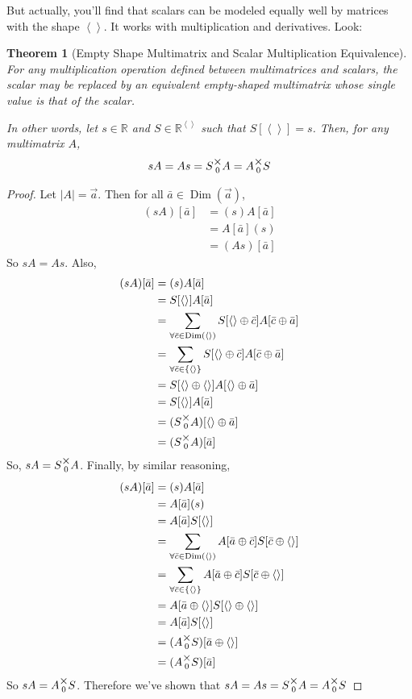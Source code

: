 \documentclass[12pt]{book}
\theoremstyle{plain}
\newtheorem{theorem}{Theorem}[chapter]
\theoremstyle{definition}
\theoremstyle{ppart}
\theoremstyle{case}
\theoremstyle{solution}
\DeclareMathOperator{\Dim}{Dim}
\newcommand{\mmult}[1]{\text{\raisebox{1ex}{$\underset{#1}{\times}$}}}
\newcommand{\shape}[1]{\left|#1\right|}
\begin{document}
But actually, you'll find that scalars can be modeled equally well by matrices
with the shape $\left<\right>$. It works with multiplication and derivatives. Look:

\begin{theorem}[Empty Shape Multimatrix and Scalar Multiplication Equivalence]
\label{s_mm_mult_equiv}
For any multiplication operation defined between multimatrices and scalars,
the scalar may be replaced by an equivalent empty-shaped multimatrix whose
single value is that of the scalar.

In other words, let $s \in \mathbb{R}$ and $S \in \mathbb{R}^{\left<\right>}$ such that
$S[\left<\right>] = s$. Then, for any multimatrix $A$, 
\[ sA = As = S \mmult{0} A = A \mmult{0} S \]
\end{theorem}
\begin{proof}
Let $\shape{A} = \vec{a}$. Then for all $\bar{a} \in \Dim(\vec{a})$,
\begin{align*}
	(sA)[\bar{a}]
	&= (s)A[\bar{a}] \\
	&= A[\bar{a}](s) \\
	&= (As)[\bar{a}]
\end{align*}
So $sA = As$. Also,
\begin{align*}
	(sA)[\bar{a}]
	&= (s)A[\bar{a}] \\
	&= S[\left<\right>]A[\bar{a}] \\
	&= \sum_{\forall \bar{c} \in \Dim(\left<\right>)}
		S[\left<\right> \oplus \bar{c}]A[\bar{c} \oplus \bar{a}] \\
	&= \sum_{\forall \bar{c} \in \{\left<\right>\}}
		S[\left<\right> \oplus \bar{c}]A[\bar{c} \oplus \bar{a}] \\
	&= S[\left<\right> \oplus \left<\right>]A[\left<\right> \oplus \bar{a}] \\
	&= S[\left<\right>]A[\bar{a}] \\
	&= (S \mmult{0} A)[\left<\right> \oplus \bar{a}] \\
	&= (S \mmult{0} A)[\bar{a}] \\
\end{align*}
So, $sA = S \mmult{0} A$.
Finally, by similar reasoning,
\begin{align*}
	(sA)[\bar{a}]
	&= (s)A[\bar{a}] \\
	&= A[\bar{a}](s) \\
	&= A[\bar{a}]S[\left<\right>] \\
	&= \sum_{\forall \bar{c} \in \Dim(\left<\right>)}
		A[\bar{a} \oplus \bar{c}] S[\bar{c} \oplus \left<\right>] \\
	&= \sum_{\forall \bar{c} \in \{\left<\right>\}}
		A[\bar{a} \oplus \bar{c}] S[\bar{c} \oplus \left<\right>] \\
	&= A[\bar{a} \oplus \left<\right>] S[\left<\right> \oplus \left<\right>] \\
	&= A[\bar{a}]S[\left<\right>] \\
	&= (A \mmult{0} S)[\bar{a} \oplus \left<\right>] \\
	&= (A \mmult{0} S)[\bar{a}]
\end{align*}
So $sA = A \mmult{0} S$. Therefore we've shown that
$sA = As = S \mmult{0} A = A \mmult{0} S$
\end{proof}
\end{document}
